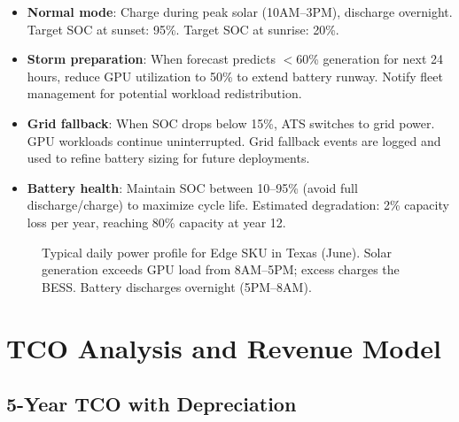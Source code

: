 \documentclass[conference,10pt,letterpaper]{IEEEtran}
\begin{document}
\begin{itemize}
\item \textbf{Normal mode}: Charge during peak solar (10AM--3PM), discharge overnight. Target SOC at sunset: 95\%. Target SOC at sunrise: 20\%.
\item \textbf{Storm preparation}: When forecast predicts $<$60\% generation for next 24 hours, reduce GPU utilization to 50\% to extend battery runway. Notify fleet management for potential workload redistribution.
\item \textbf{Grid fallback}: When SOC drops below 15\%, ATS switches to grid power. GPU workloads continue uninterrupted. Grid fallback events are logged and used to refine battery sizing for future deployments.
\item \textbf{Battery health}: Maintain SOC between 10--95\% (avoid full discharge/charge) to maximize cycle life. Estimated degradation: 2\% capacity loss per year, reaching 80\% capacity at year 12.
\end{itemize}

\begin{figure}[!t]
\centering
{}
\caption{Typical daily power profile for Edge SKU in Texas (June). Solar generation exceeds GPU load from 8AM--5PM; excess charges the BESS. Battery discharges overnight (5PM--8AM).}
\label{fig:solar_profile}
\end{figure}

\section{TCO Analysis and Revenue Model}
\label{sec:tco}

\subsection{5-Year TCO with Depreciation}
\end{document}
